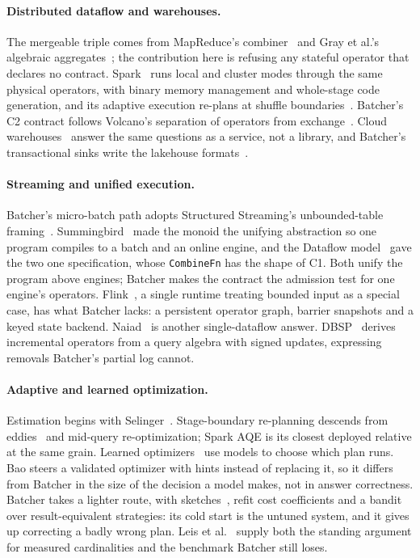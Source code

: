\documentclass[10pt,twocolumn,letterpaper]{article}   %
\newcommand{\sys}{Batcher}
\newcommand{\Ca}{\textsc{C1}}
\newcommand{\Cb}{\textsc{C2}}
\begin{document}
\paragraph{Distributed dataflow and warehouses.} The mergeable triple comes from MapReduce's
combiner~\cite{dean2004mapreduce} and Gray et al.'s algebraic aggregates~\cite{gray1997datacube};
the contribution here is refusing any stateful operator that declares no contract.
Spark~\cite{zaharia2012rdd,armbrust2015sparksql} runs local and cluster modes through the same
physical operators, with binary memory management and whole-stage code generation, and its
adaptive execution re-plans at shuffle boundaries~\cite{sparkaqe}. \sys{}'s \Cb{} contract
follows Volcano's separation of operators from exchange~\cite{graefe1994volcano}. Cloud
warehouses~\cite{sethi2019presto,dageville2016snowflake} answer the same questions as a service,
not a library, and \sys{}'s transactional sinks write the lakehouse
formats~\cite{armbrust2020delta}.

\paragraph{Streaming and unified execution.} \sys{}'s micro-batch path adopts Structured
Streaming's unbounded-table framing~\cite{armbrust2018structured}.
Summingbird~\cite{boykin2014summingbird} made the monoid the unifying abstraction so one program
compiles to a batch and an online engine, and the Dataflow model~\cite{akidau2015dataflow} gave
the two one specification, whose \texttt{CombineFn} has the shape of \Ca{}. Both unify the
program above engines; \sys{} makes the contract the admission test for one engine's operators.
Flink~\cite{carbone2015flink}, a single runtime treating bounded input as a special case, has
what \sys{} lacks: a persistent operator graph, barrier snapshots and a keyed state backend.
Naiad~\cite{murray2013naiad} is another single-dataflow answer. DBSP~\cite{budiu2023dbsp}
derives incremental operators from a query algebra with signed updates, expressing removals
\sys{}'s partial log cannot.

\paragraph{Adaptive and learned optimization.} Estimation begins with
Selinger~\cite{selinger1979access}. Stage-boundary re-planning descends from
eddies~\cite{avnur2000eddies} and mid-query re-optimization; Spark AQE is its closest deployed
relative at the same grain. Learned optimizers~\cite{marcus2019neo,marcus2021bao,kipf2019learned}
use models to choose which plan runs. Bao steers a validated optimizer with hints instead of
replacing it, so it differs from \sys{} in the size of the decision a model makes, not in
answer correctness. \sys{} takes a lighter route, with
sketches~\cite{flajolet2007hyperloglog,cormode2005countmin}, refit cost coefficients and a
bandit~\cite{auer2002ucb} over result-equivalent strategies: its cold start is the untuned
system, and it gives up correcting a badly wrong plan. Leis et al.~\cite{leis2015goodjoin}
supply both the standing argument for measured cardinalities and the benchmark \sys{} still
loses.
\end{document}
